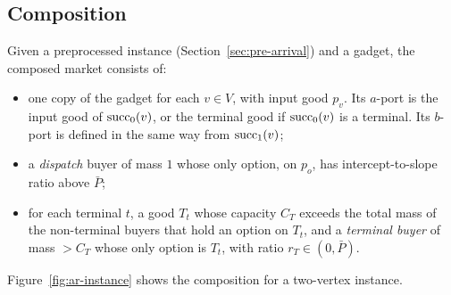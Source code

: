 \subsection{Composition}

Given a preprocessed instance (Section~\ref{sec:pre-arrival}) and a gadget, the composed market
consists of:
\begin{itemize}[nosep]
\item one copy of the gadget for each $v\in V$, with input good $p_v$. Its $a$-port is the input good of
$\mathrm{succ}_0(v)$, or the terminal good if $\mathrm{succ}_0(v)$ is a terminal. Its $b$-port is defined in the same way
from $\mathrm{succ}_1(v)$;
\item a \emph{dispatch} buyer of mass $1$ whose only option, on $p_o$, has intercept-to-slope ratio above $\bar P$;
\item for each terminal $t$, a good $T_t$ whose capacity $C_T$ exceeds the total mass of the
non-terminal buyers that hold an option on $T_t$, and a \emph{terminal buyer} of mass $>C_T$ whose only
option is $T_t$, with ratio $r_T\in(0,\bar P)$.
\end{itemize}

Figure~\ref{fig:ar-instance} shows the composition for a two-vertex instance.

